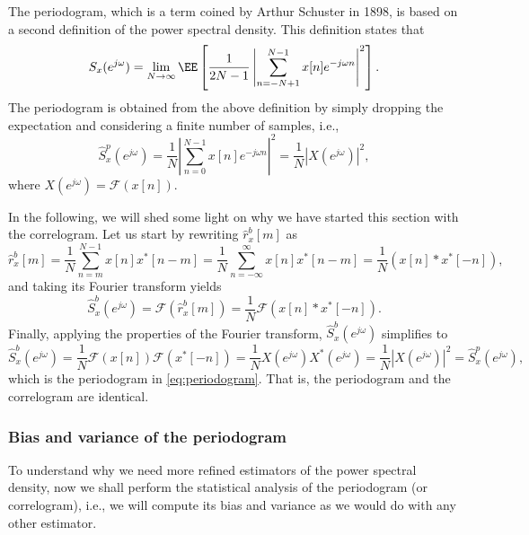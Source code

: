 The periodogram, which is a term coined by Arthur Schuster in 1898, is based on a second definition of the power spectral density. This definition states that
\begin{equation*}
S_x(e^{j \omega})
	= \lim_{N \rightarrow \infty} \EE \left[\frac{1}{2N -1} \left| \sum_{n = -N+1}^{N-1} x[n] e^{-j \omega n} \right|^2 \right].
\end{equation*}
The periodogram is obtained from the above definition by simply dropping the expectation and considering a finite number of samples, i.e.,
\begin{equation}
\label{eq:periodogram}
\hat{S}_x^{p}(e^{j \omega})
	= \frac1N \left| \sum_{n = 0}^{N-1} x[n] e^{-j \omega n} \right|^2 = \frac{1}{N} \left| X(e^{j \omega}) \right|^2,
\end{equation}
where $X(e^{j \omega})  = \mathcal{F}(x[n])$.

In the following, we will shed some light on why we have started this section with the correlogram. Let us start by rewriting $\hat{r}_{x}^{b}[m]$ as
\begin{equation*}
\hat{r}_{x}^{b}[m] = \frac{1}{N} \sum_{n = m}^{N-1} x[n] x^{\ast}[n-m] = \frac{1}{N} \sum_{n = -\infty}^{\infty} x[n] x^{\ast}[n-m]  = \frac{1}{N} \left(x[n] \ast x^{\ast}[-n]\right),
\end{equation*}
and taking its Fourier transform yields
\begin{equation*}
\hat{S}_x^{b}(e^{j \omega}) = \mathcal{F}(\hat{r}_{x}^{b}[m]) = \frac{1}{N} \mathcal{F} \left(x[n] \ast x^{\ast}[-n]\right).
\end{equation*}
Finally, applying the properties of the Fourier transform, $\hat{S}_x^{b}(e^{j \omega})$ simplifies to
\begin{equation*}
\hat{S}_x^{b}(e^{j \omega}) = \frac{1}{N} \mathcal{F} \left(x[n] \right) \mathcal{F} \left(x^{\ast}[-n]\right) = \frac{1}{N} X(e^{j \omega}) X^{\ast}(e^{j \omega}) = \frac{1}{N} \left| X(e^{j \omega}) \right|^2 = \hat{S}_x^{p}(e^{j \omega}),
\end{equation*}
which is the periodogram in \eqref{eq:periodogram}. That is, the periodogram and the correlogram are identical.

\subsubsection{Bias and variance of the periodogram}

To understand why we need more refined estimators of the power spectral density, now we shall perform the statistical analysis of the periodogram (or correlogram), i.e.,  we will compute its bias and variance as we would do with any other estimator.

